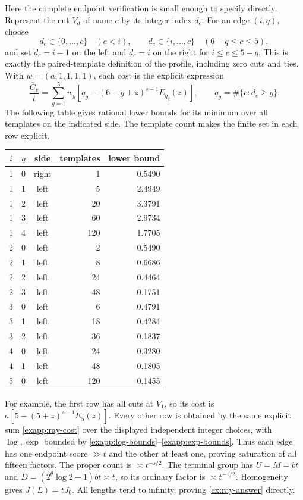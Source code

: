 Here the complete endpoint verification is small enough to specify
directly.  Represent the cut \(V_d\) of name \(c\) by its integer
index \(d_c\).  For an edge \((i,q)\), choose
\[
 d_c\in\{0,\ldots,c\}\quad(c<i),\qquad
 d_c\in\{i,\ldots,c\}\quad(6-q\le c\le5),
\]
and set \(d_c=i-1\) on the left and \(d_c=i\) on the right for
\(i\le c\le5-q\).  This is exactly the paired-template definition
of the profile, including zero cuts and ties.  With
\(w=(a,1,1,1,1)\), each cost is the explicit expression
\begin{equation}
 \frac{\overline C_v}{t}=
 \sum_{g=1}^5 w_g\left[q_g-(6-g+z)^{s-1}E_{q_g}(z)\right],
 \qquad q_g=\#\{c:d_c\ge g\}.
 \label{exapp:ray-cost}
\end{equation}
The following table gives rational lower bounds for its minimum over
all templates on the indicated side.  The template count makes the
finite set in each row explicit.
\begin{center}
\begin{tabular}{cccrr}
\(i\)&\(q\)&side&templates&lower bound\\ \hline
1&0&right&1&0.5490\\
1&1&left&5&2.4949\\
1&2&left&20&3.3791\\
1&3&left&60&2.9734\\
1&4&left&120&1.7705\\
2&0&left&2&0.5490\\
2&1&left&8&0.6686\\
2&2&left&24&0.4464\\
2&3&left&48&0.1751\\
3&0&left&6&0.4791\\
3&1&left&18&0.4284\\
3&2&left&36&0.1837\\
4&0&left&24&0.3280\\
4&1&left&48&0.1805\\
5&0&left&120&0.1455
\end{tabular}
\end{center}
For example, the first row has all cuts at \(V_1\), so its cost is
\(a[5-(5+z)^{s-1}E_5(z)]\).  Every other row is obtained by the
same explicit sum \eqref{exapp:ray-cost} over the displayed independent
integer choices, with \(\log,\exp\) bounded by
\eqref{exapp:log-bounds}--\eqref{exapp:exp-bounds}.
Thus each edge has one endpoint score \(\gg t\) and the other at
least one, proving saturation of all fifteen factors.
The proper count is \(\asymp t^{-s/2}\).
The terminal group has \(U=M=bt\) and
\(D=(2^\theta\log2-1)bt\asymp t\), so its ordinary factor is
\(\asymp t^{-1/2}\).  Homogeneity gives \(J(L)=tJ_0\).
All lengths tend to infinity, proving \eqref{ex:ray-answer} directly.

